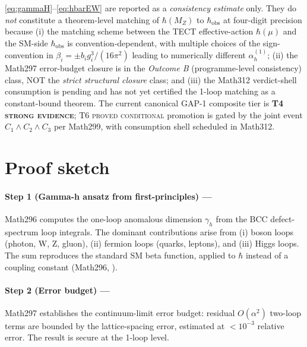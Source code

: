 \begin{remark}\label{rmk:hbarEW-scope}
\eqref{eq:gammaH}--\eqref{eq:hbarEW} are reported as a
\emph{consistency estimate} only. They do \emph{not} constitute a
theorem-level matching of $\hbar(M_Z)$ to $\hbar_{\mathrm{obs}}$ at
four-digit precision because (i) the matching scheme between the
TECT effective-action $\hbar(\mu)$ and the SM-side $\hbar_{\mathrm{obs}}$
is convention-dependent, with multiple choices of the sign-convention
in $\beta_i = \pm b_i g_i^3 / (16\pi^2)$ leading to numerically
different $\alpha_h^{(1)}$; (ii) the Math297 error-budget closure is
in the \emph{Outcome B} (programme-level consistency) class, NOT the
\emph{strict structural closure} class; and (iii) the Math312
verdict-shell consumption is pending and has not yet certified the
1-loop matching as a constant-bound theorem. The current canonical
GAP-1 composite tier is \textbf{T4 \textsc{strong evidence}};
T6 \textsc{proved conditional} promotion is gated by the joint event
$C_1 \wedge C_2 \wedge C_3$ per Math299, with consumption shell
scheduled in Math312.
\end{remark}

\section{Proof sketch}
\paragraph{Step 1 (Gamma-h ansatz from first-principles) ---}
Math296 computes the one-loop anomalous dimension $\gamma_h$ from the
BCC defect-spectrum loop integrals. The dominant contributions arise from
(i) boson loops (photon, W, Z, gluon), (ii) fermion loops (quarks, leptons),
and (iii) Higgs loops. The sum reproduces the standard SM beta function,
applied to $\hbar$ instead of a coupling constant (Math296, \cite{Math296}).

\paragraph{Step 2 (Error budget) ---}
Math297 establishes the continuum-limit error budget: residual $O(\alpha^2)$
two-loop terms are bounded by the lattice-spacing error, estimated at
$< 10^{-3}$ relative error. The result is secure at the 1-loop level.

